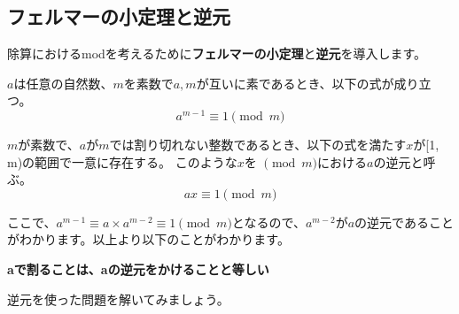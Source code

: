 \documentclass{jlreq}
\begin{document}
\subsection{フェルマーの小定理と逆元}

除算におけるmodを考えるために\textbf{フェルマーの小定理}と\textbf{逆元}を導入します。

\begin{tcolorbox}[enhanced,title=フェルマーの小定理, 
    attach boxed title to top left, 
    colback=white!95!blue,
    colbacktitle=white!10!blue!50!black,
    drop fuzzy shadow,
    boxrule=0.25mm,
    ]
    $a$は任意の自然数、$m$を素数で$a, m$が互いに素であるとき、以下の式が成り立つ。
    \begin{equation*}
        a^{m-1} \equiv 1 \pmod{m}
    \end{equation*}
  \end{tcolorbox}

\begin{tcolorbox}[enhanced,title=逆元, 
    attach boxed title to top left, 
    colback=white!95!blue,
    colbacktitle=white!10!blue!50!black,
    drop fuzzy shadow,
    boxrule=0.25mm,
    ]
    $m$が素数で、$a$が$m$では割り切れない整数であるとき、以下の式を満たす$x$が[1, m)の範囲で一意に存在する。
    このような$x$を $\pmod m$における$a$の逆元と呼ぶ。
    \begin{equation*}
        a x \equiv 1 \pmod{m}
    \end{equation*}
  \end{tcolorbox}
  ここで、$a^{m-1} \equiv a \times a^{m-2} \equiv 1 \pmod{m}$となるので、$a^{m-2}$が$a$の逆元であることがわかります。以上より以下のことがわかります。

  \vspace{0.5cm}

  \begin{center}
    \textbf{aで割ることは、aの逆元をかけることと等しい}
  \end{center}

  逆元を使った問題を解いてみましょう。
\end{document}
